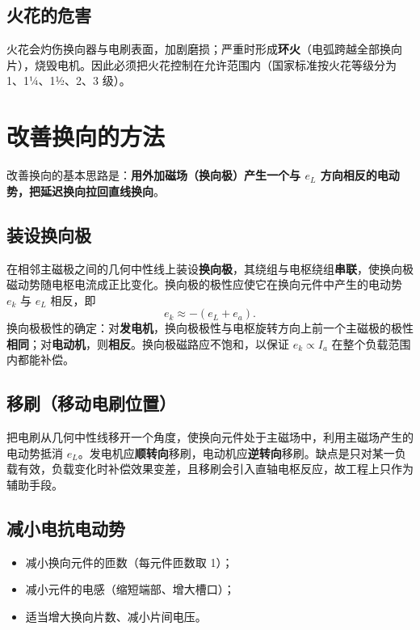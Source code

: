 \subsection{火花的危害}
火花会灼伤换向器与电刷表面，加剧磨损；严重时形成\textbf{环火}（电弧跨越全部换向片），烧毁电机。因此必须把火花控制在允许范围内（国家标准按火花等级分为 1、1¼、1½、2、3 级）。

\section{改善换向的方法}

改善换向的基本思路是：\textbf{用外加磁场（换向极）产生一个与 $e_L$ 方向相反的电动势，把延迟换向拉回直线换向}。

\subsection{装设换向极}
在相邻主磁极之间的几何中性线上装设\textbf{换向极}，其绕组与电枢绕组\textbf{串联}，使换向极磁动势随电枢电流成正比变化。换向极的极性应使它在换向元件中产生的电动势 $e_k$ 与 $e_L$ 相反，即
\begin{equation}
e_k\approx-\left(e_L+e_a\right).
\end{equation}
换向极极性的确定：对\textbf{发电机}，换向极极性与电枢旋转方向上前一个主磁极的极性\textbf{相同}；对\textbf{电动机}，则\textbf{相反}。换向极磁路应不饱和，以保证 $e_k\propto I_a$ 在整个负载范围内都能补偿。

\subsection{移刷（移动电刷位置）}
把电刷从几何中性线移开一个角度，使换向元件处于主磁场中，利用主磁场产生的电动势抵消 $e_L$。发电机应\textbf{顺转向}移刷，电动机应\textbf{逆转向}移刷。缺点是只对某一负载有效，负载变化时补偿效果变差，且移刷会引入直轴电枢反应，故工程上只作为辅助手段。

\subsection{减小电抗电动势}
\begin{itemize}
  \item 减小换向元件的匝数（每元件匝数取 1）；
  \item 减小元件的电感（缩短端部、增大槽口）；
  \item 适当增大换向片数、减小片间电压。
\end{itemize}

